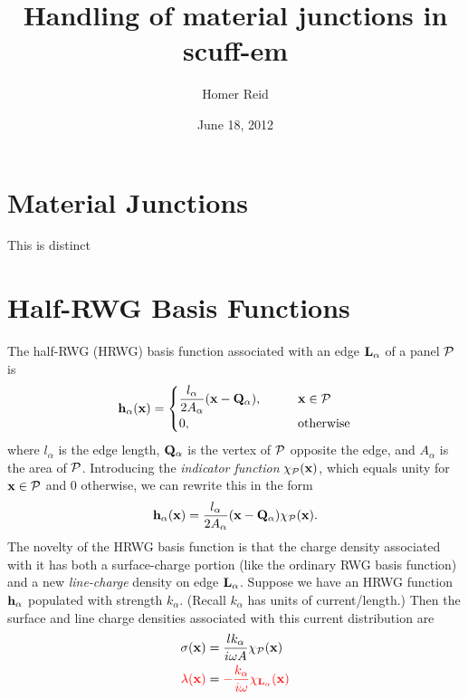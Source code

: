 \documentclass[letterpaper]{article}
\title {Handling of material junctions in {\sc scuff-em}}
\author {Homer Reid}
\date {June 18, 2012}
\begin{document}
\pagestyle{myheadings}
\maketitle

\tableofcontents

\newpage
\section{Material Junctions}

This is distinct 

\newpage
\section{Half-RWG Basis Functions}

The half-RWG (HRWG) basis function associated with 
an edge $\mathbf{L}_\alpha$ of a panel $\mathcal{P}$ is
$$ \mathbf{h}_\alpha(\mathbf{x}) = 
   \begin{cases}
   \displaystyle{ \frac{l_\alpha}{2A_\alpha}(\mathbf{x} - \mathbf{Q}_\alpha)}, 
   \qquad & \mathbf{x} \in \mathcal{P} 
   \\[5pt]
   0, \qquad & \text{otherwise}
   \end{cases}
$$
where $l_\alpha$ is the edge length, $\mathbf{Q}_\alpha$ is 
the vertex of $\mathcal{P}$ opposite the edge, and $A_\alpha$ 
is the area of $\mathcal{P}$.
Introducing the \textit{indicator function} $\chi_{\mathcal{P}}(\mathbf{x})$, 
which equals unity for $\mathbf{x}\in \mathcal{P}$ and 0 otherwise, 
we can rewrite this in the form
$$ \mathbf{h}_\alpha(\mathbf{x}) = 
   \frac{l_\alpha}{2A_\alpha}(\mathbf{x} - \mathbf{Q}_\alpha)\chi_{\mathcal{P}}(\mathbf{x}).
$$
The novelty of the HRWG basis function is that the charge density
associated with it has both a surface-charge portion 
(like the ordinary RWG basis function) and a new \textit{line-charge}
density on edge $\mathbf{L}_\alpha$. Suppose we have an HRWG function
$\mathbf{h}_\alpha$ populated with strength $k_\alpha$. (Recall $k_\alpha$
has units of current/length.) Then the surface and line charge
densities associated with this current distribution are 
\begin{align*}
  \sigma(\mathbf{x})
 &=
 \frac{lk_\alpha}{i\omega A}\chi_{\mathcal{P}}(\mathbf{x})
\\
\textcolor{red}{ \lambda(\mathbf{x})}
 &=
\textcolor{red}{-\frac{k_\alpha}{i\omega}\chi_{\mathbf{L}_\alpha}(\mathbf{x})}
\end{align*}
\end{document}
